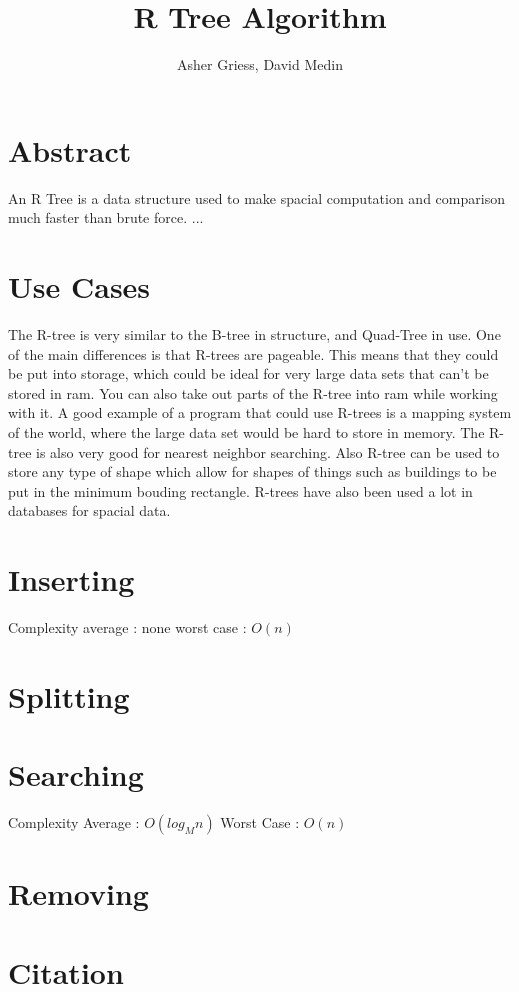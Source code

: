 \documentclass{article}
\author{Asher Griess, David Medin}
\title{R Tree Algorithm}
\begin{document}
\maketitle

\section{Abstract}
An R Tree is a data structure used to make spacial computation and comparison much faster than brute force.  ...

\section{Use Cases}
The R-tree is very similar to the B-tree in structure, and Quad-Tree in use. One of the main differences is that
R-trees are pageable. This means that they could be put into storage, which could be ideal for very large data sets
that can't be stored in ram. You can also take out parts of the R-tree into ram while working with it. A good example
of a program that could use R-trees is a mapping system of the world, where the large data set would be hard to store in memory.
The R-tree is also very good for nearest neighbor searching. Also R-tree can be used to store any type of shape which allow for shapes
of things such as buildings to be put in the minimum bouding rectangle. R-trees have also been used a lot in databases for spacial data.


\section{Inserting}
Complexity
average : none
worst case : $O(n)$
\section{Splitting}

\section{Searching}
Complexity
Average : $O(log_Mn)$
Worst Case : $O(n)$

\section{Removing}

\section{Citation}


\end{document}
